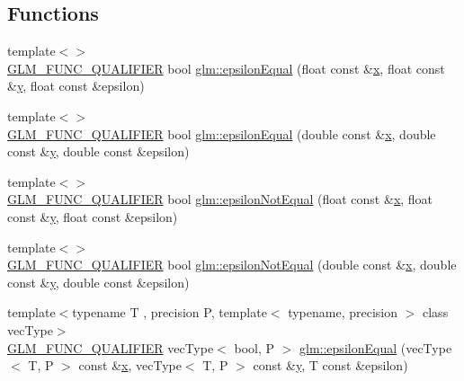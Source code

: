 \subsection*{Functions}
\begin{DoxyCompactItemize}
\item 
{\footnotesize template$<$$>$ }\\\mbox{\hyperlink{setup_8hpp_a33fdea6f91c5f834105f7415e2a64407}{G\+L\+M\+\_\+\+F\+U\+N\+C\+\_\+\+Q\+U\+A\+L\+I\+F\+I\+ER}} bool \mbox{\hyperlink{namespaceglm_aded5e7ea9a0eacd03367ad77986c2a15}{glm\+::epsilon\+Equal}} (float const \&\mbox{\hyperlink{glad_8h_a92d0386e5c19fb81ea88c9f99644ab1d}{x}}, float const \&\mbox{\hyperlink{glad_8h_a66ddd433d2cacfe27f5906b7e86faeed}{y}}, float const \&epsilon)
\item 
{\footnotesize template$<$$>$ }\\\mbox{\hyperlink{setup_8hpp_a33fdea6f91c5f834105f7415e2a64407}{G\+L\+M\+\_\+\+F\+U\+N\+C\+\_\+\+Q\+U\+A\+L\+I\+F\+I\+ER}} bool \mbox{\hyperlink{namespaceglm_a6e30ea38a0e3ebc25d87e667255057e5}{glm\+::epsilon\+Equal}} (double const \&\mbox{\hyperlink{glad_8h_a92d0386e5c19fb81ea88c9f99644ab1d}{x}}, double const \&\mbox{\hyperlink{glad_8h_a66ddd433d2cacfe27f5906b7e86faeed}{y}}, double const \&epsilon)
\item 
{\footnotesize template$<$$>$ }\\\mbox{\hyperlink{setup_8hpp_a33fdea6f91c5f834105f7415e2a64407}{G\+L\+M\+\_\+\+F\+U\+N\+C\+\_\+\+Q\+U\+A\+L\+I\+F\+I\+ER}} bool \mbox{\hyperlink{namespaceglm_af4127d65f4afc6e447d461bae25f90fe}{glm\+::epsilon\+Not\+Equal}} (float const \&\mbox{\hyperlink{glad_8h_a92d0386e5c19fb81ea88c9f99644ab1d}{x}}, float const \&\mbox{\hyperlink{glad_8h_a66ddd433d2cacfe27f5906b7e86faeed}{y}}, float const \&epsilon)
\item 
{\footnotesize template$<$$>$ }\\\mbox{\hyperlink{setup_8hpp_a33fdea6f91c5f834105f7415e2a64407}{G\+L\+M\+\_\+\+F\+U\+N\+C\+\_\+\+Q\+U\+A\+L\+I\+F\+I\+ER}} bool \mbox{\hyperlink{namespaceglm_a68d8ce38812c8599018e404afc79f088}{glm\+::epsilon\+Not\+Equal}} (double const \&\mbox{\hyperlink{glad_8h_a92d0386e5c19fb81ea88c9f99644ab1d}{x}}, double const \&\mbox{\hyperlink{glad_8h_a66ddd433d2cacfe27f5906b7e86faeed}{y}}, double const \&epsilon)
\item 
{\footnotesize template$<$typename T , precision P, template$<$ typename, precision $>$ class vec\+Type$>$ }\\\mbox{\hyperlink{setup_8hpp_a33fdea6f91c5f834105f7415e2a64407}{G\+L\+M\+\_\+\+F\+U\+N\+C\+\_\+\+Q\+U\+A\+L\+I\+F\+I\+ER}} vec\+Type$<$ bool, P $>$ \mbox{\hyperlink{group__gtc__epsilon_gaca9443f217dc36587624247245522331}{glm\+::epsilon\+Equal}} (vec\+Type$<$ T, P $>$ const \&\mbox{\hyperlink{glad_8h_a92d0386e5c19fb81ea88c9f99644ab1d}{x}}, vec\+Type$<$ T, P $>$ const \&\mbox{\hyperlink{glad_8h_a66ddd433d2cacfe27f5906b7e86faeed}{y}}, T const \&epsilon)

\end{DoxyCompactItemize}

